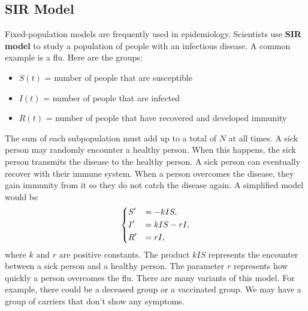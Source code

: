 \documentclass[09pt,letterpaper]{article}
\begin{document}
\subsection*{SIR Model}
Fixed-population models are frequently used in epidemiology. Scientists use \textbf{SIR model} to study a population of people with an infectious disease. A common example is a flu. Here are the groups:
\begin{itemize}
    \item $S(t)$ = number of people that are susceptible 
    \item $I(t)$ = number of people that are infected
    \item $R(t)$ = number of people that have recovered and developed immunity
\end{itemize}
The sum of each subpopulation must add up to a total of $N$ at all times. A sick person may randomly encounter a healthy person. When this happens, the sick person transmits the disease to the healthy person. A sick person can eventually recover with their immune system. When a person overcomes the disease, they gain immunity from it so they do not catch the disease again. A simplified model would be 
$$
\begin{dcases}
    S' &= -kIS,\\
    I' &= kIS - rI,\\
    R' &= rI,
\end{dcases}
$$
where $k$ and $r$ are positive constants. The product $kIS$ represents the encounter between a sick person and a healthy person. The parameter $r$ represents how quickly a person overcomes the flu. There are many variants of this model. For example, there could be a deceased group or a vaccinated group. We may have a group of carriers that don't show any symptoms.
\end{document}
